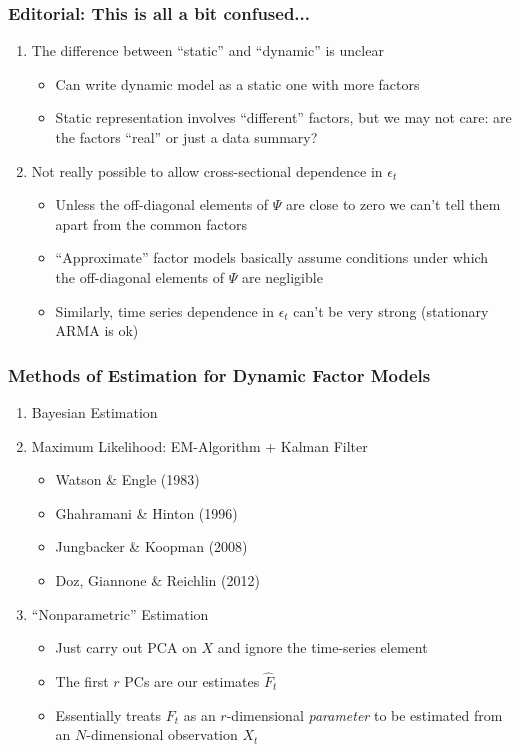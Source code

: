 \documentclass[handout]{beamer}
\begin{document}
\begin{frame}
	\frametitle{Editorial: This is all a bit confused...}

\begin{enumerate}
	\item The difference between ``static'' and ``dynamic'' is unclear \begin{itemize}
		\item Can write dynamic model as a static one with more factors
		\item Static representation involves ``different'' factors, but we may not care: are the factors ``real'' or just a data summary?
	\end{itemize} 
	\item Not really possible to allow cross-sectional dependence in $\epsilon_t$ \begin{itemize}
		\item Unless the off-diagonal elements of $\Psi$ are close to zero we can't tell them apart from the common factors
		\item ``Approximate'' factor models basically assume conditions under which the off-diagonal elements of $\Psi$ are negligible
		\item Similarly, time series dependence in $\epsilon_t$ can't be very strong (stationary ARMA is ok)
	\end{itemize}
\end{enumerate}

\end{frame}
\begin{frame}
	\frametitle{Methods of Estimation for Dynamic Factor Models}

	\begin{enumerate}
		\item Bayesian Estimation
		\item Maximum Likelihood: EM-Algorithm + Kalman Filter \begin{itemize}
			\item Watson \& Engle (1983)
			\item Ghahramani \& Hinton (1996)
			\item Jungbacker \& Koopman (2008)
			\item Doz, Giannone \& Reichlin (2012)
		\end{itemize}
		\item ``Nonparametric'' Estimation
			\begin{itemize}
				\item Just carry out PCA on $X$ and ignore the time-series element
				\item The first $r$ PCs are our estimates $\widehat{F}_t$
				\item Essentially treats $F_t$ as an $r$-dimensional \emph{parameter} to be estimated from an $N$-dimensional observation $X_t$
			\end{itemize}
	\end{enumerate}
\end{frame}
\end{document}
